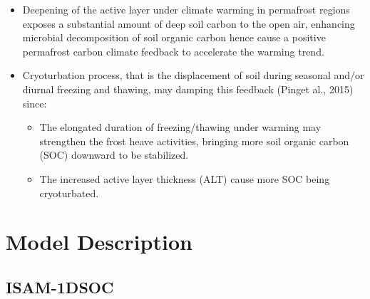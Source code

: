 \documentclass[portait,custom]{sciposter}
\begin{document}
\begin{multicols*}{4}
\begin{itemize}
  \item Deepening of the active layer under climate warming in permafrost regions exposes a substantial amount of deep soil carbon to the open air, enhancing microbial decomposition of soil organic carbon hence cause a positive permafrost carbon climate feedback to accelerate the warming trend.

  \item Cryoturbation process, that is the displacement of soil during seasonal and/or diurnal freezing and thawing, may damping this feedback (Pinget al., 2015) since:
  \begin{itemize}

    \item The elongated duration of freezing/thawing under warming may strengthen the frost heave activities, bringing more soil organic carbon (SOC) downward to be stabilized.

    \item The increased active layer thickness (ALT) cause more SOC being cryoturbated.

  \end{itemize}
\end{itemize}

\section*{Model Description}

\subsection*{ISAM-1DSOC}

\begin{itemize}


\end{itemize}
\end{multicols*}
\end{document}
